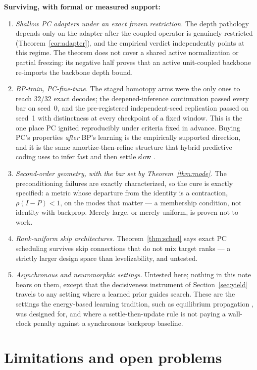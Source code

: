 \documentclass[11pt]{article}
\begin{document}
\textbf{Surviving, with formal or measured support:}
\begin{enumerate}
\item \emph{Shallow PC adapters under an exact frozen restriction.} The depth pathology
  depends only on the adapter after the coupled operator is genuinely restricted
  (Theorem~\ref{cor:adapter}), and the empirical verdict independently points at this
  regime.  The theorem does not cover a shared active normalization or partial freezing:
  its negative half proves that an active unit-coupled backbone re-imports the backbone
  depth bound.
\item \emph{BP-train, PC-fine-tune.} The staged homotopy arms were the only ones to reach
  32/32 exact decodes; the deepened-inference continuation passed every bar on seed~0, and
  the pre-registered independent-seed replication passed on seed~1 with distinctness at
  every checkpoint of a fixed window. This is the one place PC ignited reproducibly under
  criteria fixed in advance. Buying PC's properties \emph{after} BP's learning is the
  empirically supported direction, and it is the same amortize-then-refine structure that
  hybrid predictive coding uses to infer fast and then settle slow \cite{tschantz2023}.
\item \emph{Second-order geometry, with the bar set by Theorem~\ref{thm:mode}.} The
  preconditioning failures are exactly characterized, so the cure is exactly specified:
  a metric whose departure from the identity is a contraction, $\rho(I-P)<1$, on the modes
  that matter --- a membership condition, not identity with backprop. Merely large, or
  merely uniform, is proven not to work.
\item \emph{Rank-uniform skip architectures.} Theorem~\ref{thm:sched} says exact PC
  scheduling survives skip connections that do not mix target ranks --- a strictly larger
  design space than levelizability, and untested.
\item \emph{Asynchronous and neuromorphic settings.} Untested here; nothing in this note
  bears on them, except that the decisiveness instrument of Section~\ref{sec:yield}
  travels to any setting where a learned prior guides search. These are the settings the
  energy-based learning tradition, such as equilibrium propagation \cite{scellier2017},
  was designed for, and where a settle-then-update rule is not paying a wall-clock penalty
  against a synchronous backprop baseline.
\end{enumerate}

\section{Limitations and open problems}
\end{document}
